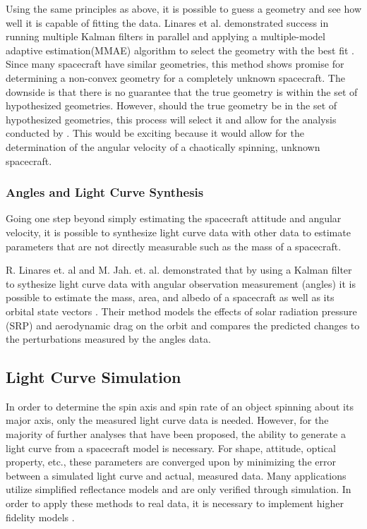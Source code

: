 \documentclass{article}
\begin{document}
Using the same principles as above, it is possible to guess a geometry and see how well it is capable of fitting the data. Linares et al. demonstrated success in running multiple Kalman filters in parallel and applying a multiple-model adaptive estimation(MMAE) algorithm to select the geometry with the best fit \cite{SpaceObjectCharacterization}. Since many spacecraft have similar geometries, this method shows promise for determining a non-convex geometry for a completely unknown spacecraft. The downside is that there is no guarantee that the true geometry is within the set of hypothesized geometries. However, should the true geometry be in the set of hypothesized geometries, this process will select it and allow for the analysis conducted by \cite{AttitudeEstimationFromLightCurve}. This would be exciting because it would allow for the determination of the angular velocity of a chaotically spinning, unknown spacecraft.

\subsubsection{Angles and Light Curve Synthesis}

Going one step beyond simply estimating the spacecraft attitude and angular velocity, it is possible to synthesize light curve data with other data to estimate parameters that are not directly measurable such as the mass of a spacecraft.

R. Linares et. al  and M. Jah. et. al. demonstrated that by using a Kalman filter to sythesize light curve data with angular observation measurement (angles) it is possible to estimate the mass, area, and albedo of a spacecraft as well as its orbital state vectors \cite{LINARES20141} \cite{StateAndParameter}. Their method models the effects of solar radiation pressure (SRP) and aerodynamic drag on the orbit and compares the predicted changes to the perturbations measured by the angles data. 

\subsection{Light Curve Simulation}

In order to determine the spin axis and spin rate of an object spinning about its major axis, only the measured light curve data is needed. However, for the majority of further analyses that have been proposed, the ability to generate a light curve from a spacecraft model is necessary. For shape, attitude, optical property, etc., these parameters are converged upon by minimizing the error between a simulated light curve and actual, measured data. Many applications utilize simplified reflectance models and are only verified through simulation. In order to apply these methods to real data, it is necessary to implement higher fidelity models \cite{AttitudeEstimationFromLightCurve}.
\end{document}
